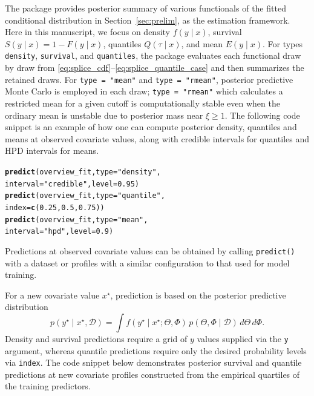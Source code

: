 \documentclass[article]{jss}\usepackage[]{graphicx}\usepackage[]{xcolor}
\makeatletter
\newcommand{\hlnum}[1]{\textcolor[rgb]{0.686,0.059,0.569}{#1}}%
\newcommand{\hlsng}[1]{\textcolor[rgb]{0.192,0.494,0.8}{#1}}%
\newcommand{\hldef}[1]{\textcolor[rgb]{0.345,0.345,0.345}{#1}}%
\newcommand{\hlkwc}[1]{\textcolor[rgb]{0.333,0.667,0.333}{#1}}%
\newcommand{\hlkwd}[1]{\textcolor[rgb]{0.737,0.353,0.396}{\textbf{#1}}}%
\newenvironment{kframe}{%
 \def\at@end@of@kframe{}%
 \ifinner\ifhmode%
  \def\at@end@of@kframe{\end{minipage}}%
  \begin{minipage}{\columnwidth}%
 \fi\fi%
 \def\FrameCommand##1{\hskip\@totalleftmargin \hskip-\fboxsep
 \colorbox{shadecolor}{##1}\hskip-\fboxsep
     \hskip-\linewidth \hskip-\@totalleftmargin \hskip\columnwidth}%
 \MakeFramed {\advance\hsize-\width
   \@totalleftmargin\z@ \linewidth\hsize
   \@setminipage}}%
 {\par\unskip\endMakeFramed%
 \at@end@of@kframe}
\newenvironment{knitrout}{}{} %
\DeclareRobustCommand{\code}[1]{\nolinkurl{#1}}
\makeatother
\begin{document}
The package provides posterior summary of various functionals of the fitted conditional distribution in Section~\ref{sec:prelim}, as the estimation framework. Here in this manuscript, we focus on density $f(y\mid x)$, survival $S(y\mid x) = 1 - F(y\mid x)$, quantiles $Q(\tau\mid x)$, and mean $E(y\mid x)$. For types \code{density}, \code{survival}, and \code{quantiles}, the package evaluates each functional draw by draw from \eqref{eq:splice_cdf}--\eqref{eq:splice_quantile_case} and then summarizes the retained draws. For \code{type = "mean"} and \code{type = "rmean"}, posterior predictive Monte Carlo is employed in each draw; \code{type = "rmean"} which calculates a restricted mean for a given cutoff is computationally stable even when the ordinary mean is unstable due to posterior mass near $\xi \ge 1$. The following code snippet is an example of how one can compute posterior density, quantiles and means at observed covariate values, along with credible intervals for quantiles and HPD intervals for means.

\begin{knitrout}\footnotesize
{}\color{fgcolor}\begin{kframe}
\begin{alltt}
\hlkwd{predict}\hldef{(overview_fit,} \hlkwc{type} \hldef{=} \hlsng{"density"}\hldef{,}
  \hlkwc{interval} \hldef{=} \hlsng{"credible"}\hldef{,} \hlkwc{level} \hldef{=} \hlnum{0.95}\hldef{)}
\hlkwd{predict}\hldef{(overview_fit,} \hlkwc{type} \hldef{=} \hlsng{"quantile"}\hldef{,}
  \hlkwc{index} \hldef{=} \hlkwd{c}\hldef{(}\hlnum{0.25}\hldef{,} \hlnum{0.5}\hldef{,} \hlnum{0.75}\hldef{))}
\hlkwd{predict}\hldef{(overview_fit,} \hlkwc{type} \hldef{=} \hlsng{"mean"}\hldef{,}
  \hlkwc{interval} \hldef{=} \hlsng{"hpd"}\hldef{,} \hlkwc{level} \hldef{=} \hlnum{0.9}\hldef{)}
\end{alltt}
\end{kframe}
\end{knitrout}

Predictions at observed covariate values can be obtained by calling \code{predict()}
with a dataset or profiles with a similar configuration to that used for model training.



For a new covariate value $x^\star$, prediction is based on the
posterior predictive distribution
\begin{equation*}
p(y^\star\mid x^\star,\mathcal{D})
=\int f(y^\star\mid x^\star;\Theta,\Phi)\,p(\Theta,\Phi\mid \mathcal{D})\,d\Theta\,d\Phi.
\end{equation*}
Density and survival predictions require a grid of $y$
values supplied via the \code{y} argument, whereas quantile predictions
require only the desired probability levels via \code{index}. The
code snippet below demonstrates posterior survival and quantile
predictions at new covariate profiles constructed from the empirical quartiles
of the training predictors.
\end{document}
